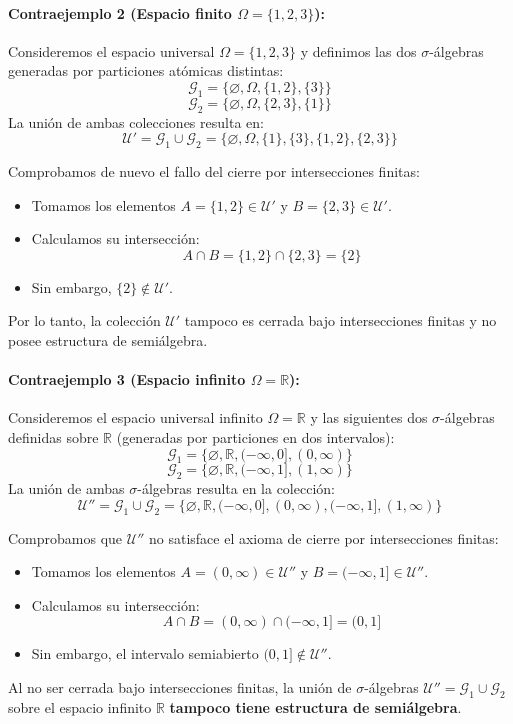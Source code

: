 \begin{problema}
\paragraph{Contraejemplo 2 (Espacio finito $\Omega = \{1, 2, 3\}$):}
Consideremos el espacio universal $\Omega = \{1, 2, 3\}$ y definimos las dos $\sigma$-álgebras generadas por particiones atómicas distintas:
\[
    \mathcal{G}_1 = \{ \varnothing, \Omega, \{1,2\}, \{3\} \}
\]
\[
    \mathcal{G}_2 = \{ \varnothing, \Omega, \{2,3\}, \{1\} \}
\]
La unión de ambas colecciones resulta en:
\[
    \mathcal{U}' = \mathcal{G}_1 \cup \mathcal{G}_2 = \{ \varnothing, \Omega, \{1\}, \{3\}, \{1,2\}, \{2,3\} \}
\]

Comprobamos de nuevo el fallo del cierre por intersecciones finitas:
\begin{itemize}
    \item Tomamos los elementos $A = \{1,2\} \in \mathcal{U}'$ y $B = \{2,3\} \in \mathcal{U}'$.
    \item Calculamos su intersección:
    \[
        A \cap B = \{1,2\} \cap \{2,3\} = \{2\}
    \]
    \item Sin embargo, $\{2\} \notin \mathcal{U}'$.
\end{itemize}
Por lo tanto, la colección $\mathcal{U}'$ tampoco es cerrada bajo intersecciones finitas y no posee estructura de semiálgebra.

\paragraph{Contraejemplo 3 (Espacio infinito $\Omega = \mathbb{R}$):}
Consideremos el espacio universal infinito $\Omega = \mathbb{R}$ y las siguientes dos $\sigma$-álgebras definidas sobre $\mathbb{R}$ (generadas por particiones en dos intervalos):
\[
    \mathcal{G}_1 = \{ \varnothing, \mathbb{R}, (-\infty, 0], (0, \infty) \}
\]
\[
    \mathcal{G}_2 = \{ \varnothing, \mathbb{R}, (-\infty, 1], (1, \infty) \}
\]
La unión de ambas $\sigma$-álgebras resulta en la colección:
\[
    \mathcal{U}'' = \mathcal{G}_1 \cup \mathcal{G}_2 = \{ \varnothing, \mathbb{R}, (-\infty, 0], (0, \infty), (-\infty, 1], (1, \infty) \}
\]

Comprobamos que $\mathcal{U}''$ no satisface el axioma de cierre por intersecciones finitas:
\begin{itemize}
    \item Tomamos los elementos $A = (0, \infty) \in \mathcal{U}''$ y $B = (-\infty, 1] \in \mathcal{U}''$.
    \item Calculamos su intersección:
    \[
        A \cap B = (0, \infty) \cap (-\infty, 1] = (0, 1]
    \]
    \item Sin embargo, el intervalo semiabierto $(0, 1] \notin \mathcal{U}''$.
\end{itemize}
Al no ser cerrada bajo intersecciones finitas, la unión de $\sigma$-álgebras $\mathcal{U}'' = \mathcal{G}_1 \cup \mathcal{G}_2$ sobre el espacio infinito $\mathbb{R}$ \textbf{tampoco tiene estructura de semiálgebra}.


\end{problema}
